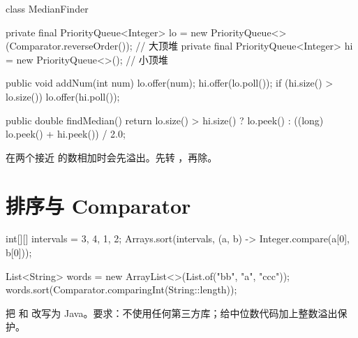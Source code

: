 \begin{javacode}
class MedianFinder {
    private final PriorityQueue<Integer> lo =
        new PriorityQueue<>(Comparator.reverseOrder()); // 大顶堆
    private final PriorityQueue<Integer> hi =
        new PriorityQueue<>();                          // 小顶堆

    public void addNum(int num) {
        lo.offer(num);
        hi.offer(lo.poll());
        if (hi.size() > lo.size()) lo.offer(hi.poll());
    }

    public double findMedian() {
        return lo.size() > hi.size()
            ? lo.peek()
            : ((long) lo.peek() + hi.peek()) / 2.0;
    }
}
\end{javacode}

\begin{pitfall}
 在两个接近  的数相加时会先溢出。先转 ，再除。
\end{pitfall}

\section{排序与 Comparator}

\begin{javacode}
int[][] intervals = {{3, 4}, {1, 2}};
Arrays.sort(intervals, (a, b) -> Integer.compare(a[0], b[0]));

List<String> words = new ArrayList<>(List.of("bb", "a", "ccc"));
words.sort(Comparator.comparingInt(String::length));
\end{javacode}

\begin{drill}
把  和  改写为 Java。要求：不使用任何第三方库；给中位数代码加上整数溢出保护。
\end{drill}
